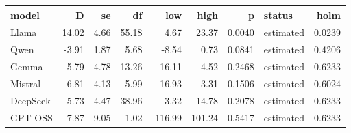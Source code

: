 \begin{tabular}{lrrrrrrlr}
\toprule
model & D & se & df & low & high & p & status & holm \\
\midrule
Llama & 14.02 & 4.66 & 55.18 & 4.67 & 23.37 & 0.0040 & estimated & 0.0239 \\
Qwen & -3.91 & 1.87 & 5.68 & -8.54 & 0.73 & 0.0841 & estimated & 0.4206 \\
Gemma & -5.79 & 4.78 & 13.26 & -16.11 & 4.52 & 0.2468 & estimated & 0.6233 \\
Mistral & -6.81 & 4.13 & 5.99 & -16.93 & 3.31 & 0.1506 & estimated & 0.6024 \\
DeepSeek & 5.73 & 4.47 & 38.96 & -3.32 & 14.78 & 0.2078 & estimated & 0.6233 \\
GPT-OSS & -7.87 & 9.05 & 1.02 & -116.99 & 101.24 & 0.5417 & estimated & 0.6233 \\
\bottomrule
\end{tabular}
